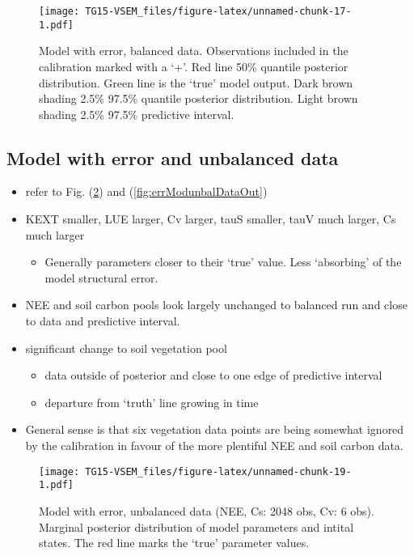 \documentclass[]{article}
\providecommand{\tightlist}{%
  \setlength{\itemsep}{0pt}\setlength{\parskip}{0pt}}
\begin{document}
\begin{figure}
\centering
\texttt{[image: TG15-VSEM\_files/figure-latex/unnamed-chunk-17-1.pdf]}
\caption{\label{fig:errModbalDataOut}Model with error, balanced data.
Observations included in the calibration marked with a `+'. Red line
50\% quantile posterior distribution. Green line is the `true' model
output. Dark brown shading 2.5\% 97.5\% quantile posterior distribution.
Light brown shading 2.5\% 97.5\% predictive interval.}
\end{figure}

\subsection{Model with error and unbalanced
data}\label{model-with-error-and-unbalanced-data}

\begin{itemize}
\tightlist
\item
  refer to Fig. (\ref{fig:errModunbalDataPar}) and
  (\ref{fig:errModunbalDataOut})
\item
  KEXT smaller, LUE larger, Cv larger, tauS smaller, tauV much larger,
  Cs much larger

  \begin{itemize}
  \tightlist
  \item
    Generally parameters closer to their `true' value. Less `absorbing'
    of the model structural error.
  \end{itemize}
\item
  NEE and soil carbon pools look largely unchanged to balanced run and
  close to data and predictive interval.
\item
  significant change to soil vegetation pool

  \begin{itemize}
  \tightlist
  \item
    data outside of posterior and close to one edge of predictive
    interval
  \item
    departure from `truth' line growing in time
  \end{itemize}
\item
  General sense is that six vegetation data points are being somewhat
  ignored by the calibration in favour of the more plentiful NEE and
  soil carbon data.
\end{itemize}

\begin{figure}
\centering
\texttt{[image: TG15-VSEM\_files/figure-latex/unnamed-chunk-19-1.pdf]}
\caption{\label{fig:errModunbalDataPar}Model with error, unbalanced data
(NEE, Cs: 2048 obs, Cv: 6 obs). Marginal posterior distribution of model
parameters and intital states. The red line marks the `true' parameter
values.}
\end{figure}
\end{document}
